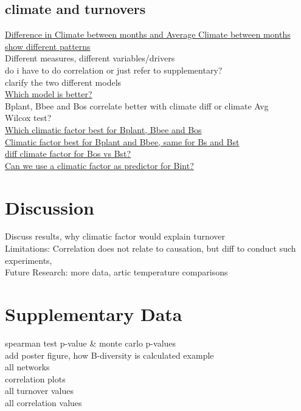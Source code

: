 \documentclass[11pt]{article}
\begin{document}
\subsection{climate and turnovers}
\underline{Difference in Climate between months and Average Climate between months show different patterns} \\
Different measures, different variables/drivers\\
do i have to do correlation or just refer to supplementary? \\
clarify the two different models \\

\underline{Which model is better?} \\
Bplant, Bbee and Bos correlate better with climate diff or climate Avg \\
Wilcox test? \\

\underline{Which climatic factor best for Bplant, Bbee and Bos} \\

\underline{Climatic factor best for Bplant and Bbee, same for Bs and Bst} \\

\underline{diff climate factor for Bos vs Bst? } \\

\underline{Can we use a climatic factor as predictor for Bint?} \\

\newpage
\section{Discussion} %
Discuss results, why climatic factor would explain turnover \\
Limitations: Correlation does not relate to causation, but diff to conduct such experiments,  \\
Future Research: more data, artic temperature comparisons \\

\section{Supplementary Data}
spearman test p-value \& monte carlo p-values \\
add poster figure, how B-diversity is calculated example  \\
all networks \\
correlation plots \\
all turnover values \\
all correlation values \\
\end{document}

